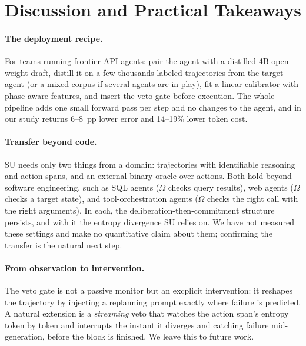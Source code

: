 \documentclass[11pt]{article}
\newcommand{\Hnumber}[1]{#1}
\newcommand{\impDeltaErrSB}{6}
\newcommand{\impDeltaErrDA}{8}
\newcommand{\impTokSaveSB}{14}
\newcommand{\impTokSaveDA}{19}
\begin{document}
\section{Discussion and Practical Takeaways}
\label{sec:discussion}

\paragraph{The deployment recipe.}
For teams running frontier API agents: pair the agent with a distilled \Hnumber{4B}
open-weight draft, distill it on a few thousands labeled trajectories
from the target agent (or a mixed corpus if several agents are in play), fit a linear calibrator
with phase-aware features, and insert the veto gate before execution. The whole pipeline adds one
small forward pass per step and no changes to the agent, and in our study returns \impDeltaErrSB--\impDeltaErrDA~pp
lower error and \impTokSaveSB--\impTokSaveDA\% lower token cost.

\paragraph{Transfer beyond code.}
SU needs only two things from a domain: trajectories with identifiable reasoning and action spans,
and an external binary oracle over actions. Both hold beyond software engineering, such as SQL agents
($\Omega$ checks query results), web agents ($\Omega$ checks a target state), and
tool-orchestration agents ($\Omega$ checks the right call with the right arguments). In each, the
deliberation-then-commitment structure persists, and with it the entropy divergence SU relies on.
We have not measured these settings and make no quantitative claim about them; confirming the
transfer is the natural next step.

\paragraph{From observation to intervention.}
The veto gate is not a passive monitor but an excplicit intervention: it reshapes the trajectory by
injecting a replanning prompt exactly where failure is predicted. A natural extension is a
\emph{streaming} veto that watches the action span's entropy token by token and interrupts the
instant it diverges and catching failure mid-generation, before the block is finished. We leave this
to future work.
\end{document}

